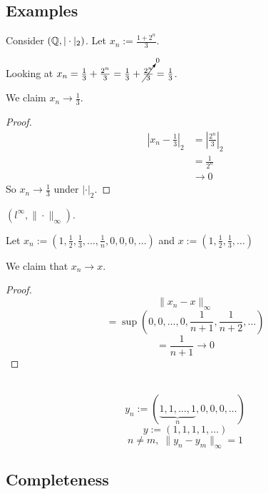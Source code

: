 \documentclass[12pt]{article}
\begin{document}
\subsection{Examples}


\bboxexam
\begin{exam}
    Consider \((\mathbb Q,|\cdot|_2)\). Let \(x_n:=\frac{1+2^n}3\).
    \bboxnote
    \begin{note}
        Looking at \(x_n=\frac13+\frac{2^n}3=\frac13+\cancelto0{\frac{2^n}3}=\frac13\).
    \end{note}
    \ebox
    We claim \(x_n\to\frac13\).
    \bboxproof
    \begin{proof}\
        \begin{align*}
            \left|x_n-\frac13\right|_2&=\left|\frac{2^n}3\right|_2\\
                           &=\frac1{2^n}\\
                           &\to 0
        \end{align*}
        So \(x_n\to\frac13\) under \(|\cdot|_2\).
    \end{proof}
    \ebox
\end{exam}
\ebox

\bboxexam
\begin{exam}
    \((l^\infty,\|\cdot\|_\infty)\).

    Let \(x_n:=\left(1,\frac12,\frac13,\dots,\frac1n,0,0,0,\dots\right)\) and
    \(x:=\left(1,\frac12,\frac13,\dots\right)\)

    We claim that \(x_n\to x\).
    \bboxproof
    \begin{proof}
        \[\|x_n-x\|_\infty\]
        \[=\sup\left(0,0,\dots,0,\frac1{n+1},\frac1{n+2},\dots\right)\]
        \[=\frac1{n+1}\to0\]
    \end{proof}
    \ebox
\end{exam}
\ebox

\bboxexam
\begin{exam}\
    \[y_n:=(\underset n{\underbrace{1,1,\dots,1}},0,0,0,\dots)\]
    \[y:=(1,1,1,1,\dots)\]
    \[n\neq m,\;
    \|y_n-y_m\|_\infty=1\]
\end{exam}
\ebox

\subsection{Completeness}
\end{document}
